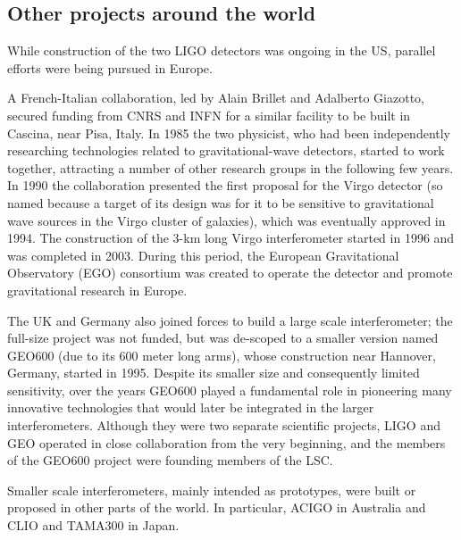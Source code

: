 \subsection{Other projects around the world}
While construction of the two LIGO detectors was ongoing in the US, parallel efforts were being pursued in Europe.

A French-Italian collaboration, led by Alain Brillet and Adalberto Giazotto, secured funding from CNRS and INFN for a similar facility to be built in Cascina, near Pisa, Italy.
In 1985 the two physicist, who had been independently researching technologies related to gravitational-wave detectors, started to work together, attracting a number of other research groups in the following few years.
In 1990 the collaboration presented the first proposal for the Virgo detector (so named because a target of its design was for it to be sensitive to gravitational wave sources in the Virgo cluster of galaxies), which was eventually approved in 1994.
The construction of the 3-km long Virgo interferometer started in 1996 and was completed in 2003.
During this period, the European Gravitational Observatory (EGO) consortium was created to operate the detector and promote gravitational research in Europe.

The UK and Germany also joined forces to build a large scale interferometer; the full-size project was not funded, but was de-scoped to a smaller version named GEO600 (due to its 600 meter long arms), whose construction near Hannover, Germany, started in 1995.
Despite its smaller size and consequently limited sensitivity, over the years GEO600 played a fundamental role in pioneering many innovative technologies that would later be integrated in the larger interferometers.
Although they were two separate scientific projects, LIGO and GEO operated in close collaboration from the very beginning, and the members of the GEO600 project were founding members of the LSC.

Smaller scale interferometers, mainly intended as prototypes, were built or 
proposed in other parts of the world. In particular, ACIGO in Australia and 
CLIO and TAMA300 in Japan. 

